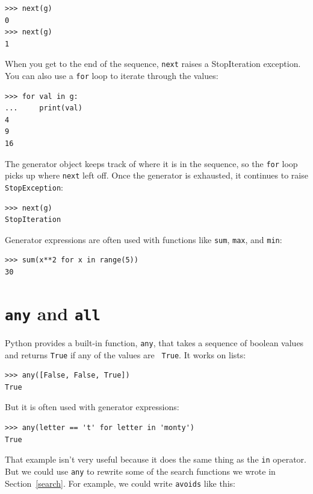 \documentclass[10pt]{book}
\begin{document}
\begin{verbatim}
>>> next(g)
0
>>> next(g)
1
\end{verbatim}
%
When you get to the end of the sequence, {\tt next} raises a 
StopIteration exception.  You can also use a {\tt for} loop to iterate
through the values:

\begin{verbatim}
>>> for val in g:
...     print(val)
4
9
16
\end{verbatim}
%
The generator object keeps track of where it is in the sequence,
so the {\tt for} loop picks up where {\tt next} left off.  Once the
generator is exhausted, it continues to raise {\tt StopException}:

\begin{verbatim}
>>> next(g)
StopIteration
\end{verbatim}

Generator expressions are often used with functions like {\tt sum},
{\tt max}, and {\tt min}:

\begin{verbatim}
>>> sum(x**2 for x in range(5))
30
\end{verbatim}


\section{{\tt any} and {\tt all}}

Python provides a built-in function, {\tt any}, that takes a sequence
of boolean values and returns {\tt True} if any of the values are {\tt
  True}.  It works on lists:

\begin{verbatim}
>>> any([False, False, True])
True
\end{verbatim}
%
But it is often used with generator expressions:

\begin{verbatim}
>>> any(letter == 't' for letter in 'monty')
True
\end{verbatim}
%
That example isn't very useful because it does the same thing
as the {\tt in} operator.  But we could use {\tt any} to rewrite
some of the search functions we wrote in Section~\ref{search}.  For
example, we could write {\tt avoids} like this:
\end{document}
